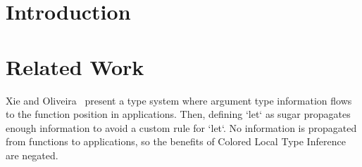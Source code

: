 \documentclass[9pt]{extarticle}
\begin{document}
\section{Introduction}

\section{Related Work}

Xie and Oliveira~\cite{xie2018let} present a type system where
argument type information flows to the function position in applications.
Then, defining `let` as sugar propagates enough information to avoid
a custom rule for `let`.
No information is propagated from functions to applications, so the benefits
of Colored Local Type Inference are negated.

\printbibliography
\end{document}

